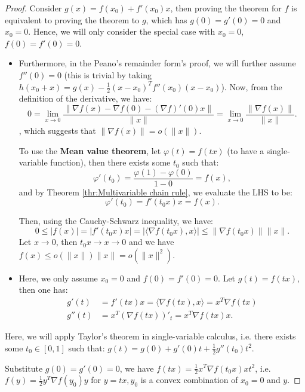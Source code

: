 \begin{proof}
  Consider \( g(x) = f(x_{0}) + f'(x_{0})x \), then proving the theorem for \( f
  \) is equivalent to proving the theorem to \( g \), which has \( g(0) = g'(0)
  = 0\) and \( x_{0} = 0 \). Hence, we will only consider the special case with
  \( x_{0} = 0 \), \( f(0) = f'(0) = 0 \).

  \begin{itemize}
  \item Furthermore, in the Peano's remainder form's proof, we will further assume \(
    f''(0) = 0 \) (this is trivial by taking \( h(x_{0} + x) = g(x) -
    \frac{1}{2}(x-x_{0})^{T}f''(x_{0})(x-x_{0}) \)). Now, from the definition of
    the derivative, we have:
    \[
      0 = \lim_{x \to 0} \frac{\|\nabla f(x) - \nabla f(0) - (\nabla
      f)'(0)x\|}{\|x\|} = \lim_{x \to  0} \frac{\|\nabla f(x)\|}{\|x\|}
    .\], which suggests that \( \|\nabla f(x)\| = o(\|x\|) \).

    To use the \textbf{Mean value theorem}, let \( \varphi(t) = f(tx) \)
    (to have a single-variable function), then there exists some \( t_{0} \) such
    that:
\[
  \varphi'(t_{0}) = \frac{\varphi(1) - \varphi(0)}{1 - 0} = f(x)
,\] and by Theorem \ref{thr:Multivariable chain rule}, we evaluate the LHS to
be:
\[
  \varphi'(t_{0}) = f'(t_{0}x)x = f(x)
.\] 

Then, using the Cauchy-Schwarz inequality, we have:
\[
  0 \le  |f(x)| = |f'(t_{0}x)x| = |\langle \nabla f(t_{0}x), x \rangle| \le
  \|\nabla f(t_{0}x)\| \| x\|
.\] 
Let \( x \to 0 \), then \( t_{0}x \to x \to 0 \) and we have \( f(x) \le
o(\|x\|)\|x\| = o(\|x\|^2) \).

\item Here, we only assume \( x_{0} = 0 \) and \( f(0) = f'(0) = 0 \). Let \(
  g(t) = f(tx) \), then one has:
  \begin{align*}
    g'(t) &= f'(tx)x = \langle \nabla f(tx), x \rangle = x^{T} \nabla f(tx) \\
    g''(t) &=  x^{T}(\nabla f(tx))'_{t} = x^{T}\nabla f(tx)x
  .\end{align*}
  \end{itemize}

  Here, we will apply Taylor's theorem in single-variable calculus, i.e. there
  exists some \( t_{0} \in [0, 1] \) such that:
  \( g(t) = g(0) + g'(0)t + \frac{1}{2}g''(t_{0})t^2 \).

  Substitute \( g(0) = g'(0) = 0 \), we have \( f(tx) = \frac{1}{2} x^{T}\nabla
  f(t_{0}x)x t^2\), i.e. \( f(y) = \frac{1}{2}y^{T}\nabla f(y_{0})y \) for \( y
  = tx, y_{0} \) is a convex combination of \( x_{0} = 0 \) and \( y \).
\end{proof}

